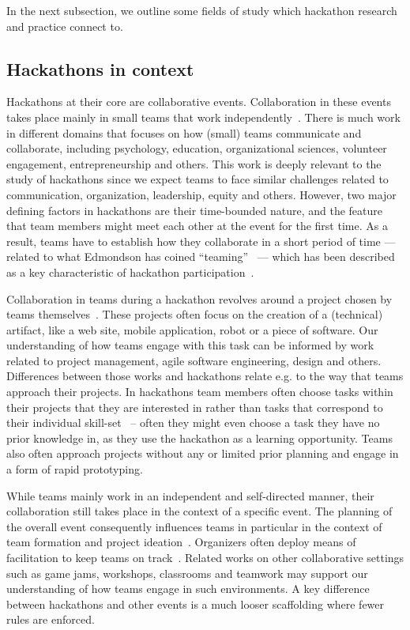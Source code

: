 \documentclass{ieeeaccess}
\begin{document}
In the next subsection, we outline some fields of study which hackathon research and practice connect to.

\subsection{Hackathons in context}
Hackathons at their core are collaborative events. 
Collaboration in these events takes place mainly in small teams that work independently~\cite{trainer2016hackathon}. 
There is much work in different domains that focuses on how (small) teams communicate and collaborate, including psychology, education, organizational sciences, volunteer engagement, entrepreneurship and others. 
This work is deeply relevant to the study of hackathons since we expect teams to face similar challenges related to communication, organization, leadership, equity and others. 
However, two major defining factors in hackathons are their time-bounded nature, and the feature that team members might meet each other at the event for the first time. 
As a result, teams have to establish how they collaborate in a short period of time --- related to what Edmondson has coined ``teaming''~\cite{edmondson2012teaming} --- which has been described as a key characteristic of hackathon participation~\cite{falk2022supporting}.

Collaboration in teams during a hackathon revolves around a project chosen by teams themselves~\cite{pe2019understanding}. 
These projects often focus on the creation of a (technical) artifact, like a web site, mobile application, robot or a piece of software. 
Our understanding of how teams engage with this task can be informed by work related to project management, agile software engineering, design and others. 
Differences between those works and hackathons relate e.g. to the way that teams approach their projects. 
In hackathons team members often choose tasks within their projects that they are interested in rather than tasks that correspond to their individual skill-set~\cite{nolte2018you} -- often they might even choose a task they have no prior knowledge in, as they use the hackathon as a learning opportunity. 
Teams also often approach projects without any or limited prior planning and engage in a form of rapid prototyping.

While teams mainly work in an independent and self-directed manner, their collaboration still takes place in the context of a specific event. 
The planning of the overall event consequently influences teams in particular in the context of team formation and project ideation~\cite{olesen2018four}. 
Organizers often deploy means of facilitation to keep teams on track~\cite{taylor2018everybody}. 
Related works on other collaborative settings such as game jams, workshops, classrooms and teamwork may support our understanding of how teams engage in such environments. 
A key difference between hackathons and other events is a much looser scaffolding where fewer rules are enforced.
\end{document}

